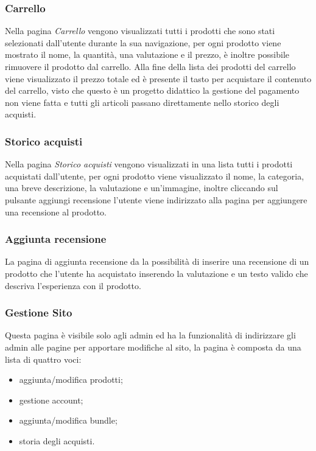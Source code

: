 \subsubsection{Carrello}
Nella pagina \emph{Carrello} vengono visualizzati tutti i prodotti che sono stati selezionati dall'utente durante la sua navigazione, per ogni prodotto viene mostrato il nome, la quantità, una valutazione e il prezzo, è inoltre possibile rimuovere il prodotto dal carrello.\newline
Alla fine della lista dei prodotti del carrello viene visualizzato il prezzo totale ed è presente il tasto per acquistare il contenuto del carrello, visto che questo è un progetto didattico la gestione del pagamento non viene fatta e tutti gli articoli passano direttamente nello storico degli acquisti.

\subsubsection{Storico acquisti}
Nella pagina \emph{Storico acquisti} vengono visualizzati in una lista tutti i prodotti acquistati dall'utente, per ogni prodotto viene visualizzato il nome, la categoria, una breve descrizione, la valutazione e un'immagine, inoltre cliccando sul pulsante aggiungi recensione l'utente viene indirizzato alla pagina per aggiungere una recensione al prodotto.

\subsubsection{Aggiunta recensione}
La pagina di aggiunta recensione da la possibilità di inserire una recensione di un prodotto che l'utente ha acquistato inserendo la valutazione e un testo valido che descriva l'esperienza con il prodotto.

\subsubsection{Gestione Sito}
Questa pagina è visibile solo agli admin ed ha la funzionalità di indirizzare gli admin alle pagine per apportare modifiche al sito, la pagina è composta da una lista di quattro voci:
\begin{itemize}
	\item aggiunta/modifica prodotti;
	\item gestione account;
	\item aggiunta/modifica bundle;
	\item storia degli acquisti.
\end{itemize}

